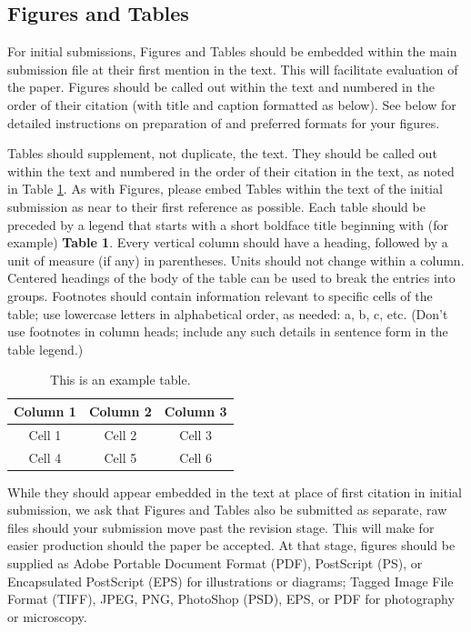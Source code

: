 \documentclass{article}
\begin{document}
\subsection*{Figures and Tables}
For initial submissions, Figures and Tables should be embedded within the main submission file at their first mention in the text. This will facilitate evaluation of the paper. Figures should be called out within the text and numbered in the order of their citation (with title and caption formatted as below). See below for detailed instructions on preparation of and preferred formats for your figures.

Tables should supplement, not duplicate, the text. They should be called out within the text and numbered in the order of their citation in the text, as noted in Table \ref{tab:1}. As with Figures, please embed Tables within the text of the initial submission as near to their first reference as possible. Each table should be preceded by a legend that starts with a short boldface title beginning with (for example) \textbf{Table 1}. Every vertical column should have a heading, followed by a unit of measure (if any) in parentheses. Units should not change within a column. Centered headings of the body of the table can be used to break the entries into groups. Footnotes should contain information relevant to specific cells of the table; use lowercase letters in alphabetical order, as needed: a, b, c, etc. (Don’t use footnotes in column heads; include any such details in sentence form in the table legend.)

\begin{table}[b]
    \caption{This is an example table.}    
    \centering
    \begin{tabular}{ccc}
            \hline
            Column 1 & Column 2 & Column 3 \\  
            \hline
            Cell 1 & Cell 2 & Cell 3\\ 
            Cell 4 & Cell 5 & Cell 6 \\
            \hline
            \end{tabular}

    \label{tab:1}
\end{table}

While they should appear embedded in the text at place of first citation in initial submission, we ask that Figures and Tables also be submitted as separate, raw files should your submission move past the revision stage. This will make for easier production should the paper be accepted. At that stage, figures should be supplied as Adobe Portable Document Format (PDF), PostScript (PS), or Encapsulated PostScript (EPS) for illustrations or diagrams; Tagged Image File Format (TIFF), JPEG, PNG, PhotoShop (PSD), EPS, or PDF for photography or microscopy.
\end{document}

